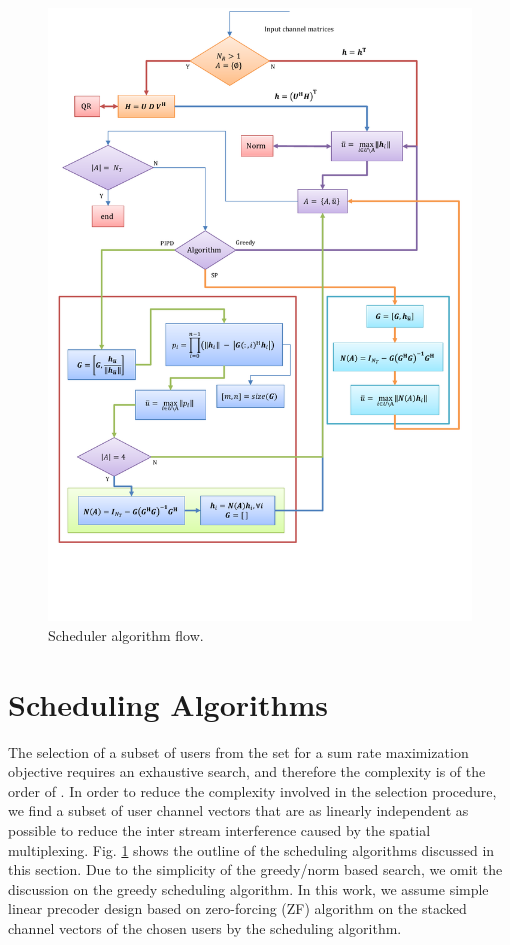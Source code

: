 \documentclass[conference,letterpaper]{./../../IEEE/IEEEtran}
\begin{document}
\begin{figure}
	\centering
	\includegraphics[trim=0in 1.5in 0in 0.75in,width=\columnwidth, angle=0]{Algorithm_Model}
	\caption{Scheduler algorithm flow.}
	\label{kuva:scheduler_block_diag}
	\vspace{-0.1in}
\end{figure}

\section{Scheduling Algorithms}
\label{sec:sched_discussions}
The selection of a subset of users  from the set  for a sum rate maximization objective requires an exhaustive search, and therefore the complexity is of the order of . In order to reduce the complexity involved in the selection procedure, we find a subset of user channel vectors that are as linearly independent as possible to reduce the inter stream interference caused by the spatial multiplexing. Fig. \ref{kuva:scheduler_block_diag} shows the outline of the scheduling algorithms discussed in this section. Due to the simplicity of the greedy/norm based search, we omit the discussion on the greedy scheduling algorithm. In this work, we assume simple linear precoder design based on zero-forcing (ZF) algorithm on the stacked channel vectors of the chosen users by the scheduling algorithm.
\end{document}
